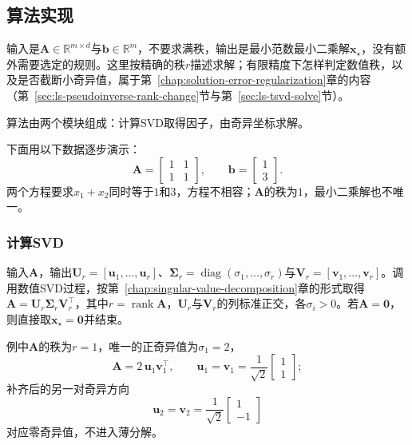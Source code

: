 \subsection{算法实现}

输入是$\bm A\in\mathbb R^{m\times d}$与$\bm b\in\mathbb R^m$，不要求满秩，输出是最小范数最小二乘解$\bm x_\star$，没有额外需要选定的规则。这里按精确的秩$r$描述求解；有限精度下怎样判定数值秩，以及是否截断小奇异值，属于第~\ref{chap:solution-error-regularization}章的内容（第~\ref{sec:ls-pseudoinverse-rank-change}节与第~\ref{sec:ls-tsvd-solve}节）。

算法由两个模块组成：计算SVD取得因子，由奇异坐标求解。

下面用以下数据逐步演示：
\[
 \bm A=\begin{bmatrix}1&1\\1&1\end{bmatrix},\qquad
 \bm b=\begin{bmatrix}1\\3\end{bmatrix}.
\]
两个方程要求$x_1+x_2$同时等于$1$和$3$，方程不相容；$\bm A$的秩为$1$，最小二乘解也不唯一。

\subsubsection{计算SVD}
输入$\bm A$，输出$\bm U_r=[\bm u_1,\ldots,\bm u_r]$、$\bm\Sigma_r=\operatorname{diag}(\sigma_1,\ldots,\sigma_r)$与$\bm V_r=[\bm v_1,\ldots,\bm v_r]$。调用数值SVD过程，按第~\ref{chap:singular-value-decomposition}章的形式取得$\bm A=\bm U_r\bm\Sigma_r\bm V_r^\top$，其中$r=\operatorname{rank}\bm A$，$\bm U_r$与$\bm V_r$的列标准正交，各$\sigma_i>0$。若$\bm A=\bm0$，则直接取$\bm x_\star=\bm0$并结束。

例中$\bm A$的秩为$r=1$，唯一的正奇异值为$\sigma_1=2$，
\[
 \bm A=2\,\bm u_1\bm v_1^\top,\qquad
 \bm u_1=\bm v_1=\frac1{\sqrt2}\begin{bmatrix}1\\1\end{bmatrix};
\]
补齐后的另一对奇异方向
\[
 \bm u_2=\bm v_2=\frac1{\sqrt2}\begin{bmatrix}1\\-1\end{bmatrix}
\]
对应零奇异值，不进入薄分解。

